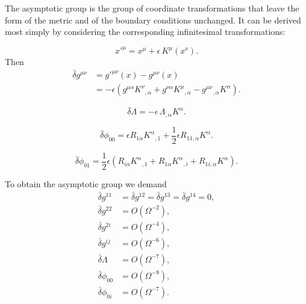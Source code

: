 The asymptotic group is the group of coordinate transformations
that leave the form of the metric and of the boundary conditions
unchanged. It can be derived most simply by considering the
corresponding infinitesimal transformations:

\begin{equation}
x'^{\mu}
=
x^{\mu}
+
\epsilon\,K^{\mu}(x^\nu).
\tag{8.1}
\end{equation}
Then
\begin{equation}
\begin{aligned}
\bar{\delta}g^{\mu\nu}
&=
g'^{\mu\nu}(x)-g^{\mu\nu}(x)
\\
&=
-\epsilon
\left(
g^{\mu\alpha}K^\nu{}_{,\alpha}
+
g^{\nu\alpha}K^\mu{}_{,\alpha}
-
g^{\mu\nu}{}_{,\alpha}K^\alpha
\right).
\end{aligned}
\tag{8.2}
\end{equation}

\begin{equation}
\bar{\delta}\Lambda
=
-\epsilon\,\Lambda_{,\alpha}K^\alpha.
\tag{8.3}
\end{equation}

\begin{equation}
\bar{\delta}\phi_{00}
=
\epsilon R_{1\alpha}K^\alpha{}_{,1}
+
\frac{1}{2}\epsilon R_{11,\alpha}K^\alpha.
\tag{8.4}
\end{equation}

\begin{equation}
\bar{\delta}\phi_{01}
=
\frac{1}{2}\epsilon
\left(
R_{i\alpha}K^\alpha{}_{,1}
+
R_{1\alpha}K^\alpha{}_{,i}
+
R_{1i,\alpha}K^\alpha
\right).
\tag{8.5}
\end{equation}

To obtain the asymptotic group we demand
\begin{equation}
\begin{aligned}
\bar{\delta}g^{11}
&=
\bar{\delta}g^{12}
=
\bar{\delta}g^{13}
=
\bar{\delta}g^{14}
=
0,
\\
\bar{\delta}g^{22}
&=
O(\Omega^{-2}),
\\
\bar{\delta}g^{2i}
&=
O(\Omega^{-4}),
\\
\bar{\delta}g^{ij}
&=
O(\Omega^{-6}),
\\
\bar{\delta}\Lambda
&=
O(\Omega^{-7}),
\\
\bar{\delta}\phi_{00}
&=
O(\Omega^{-9}),
\\
\bar{\delta}\phi_{0i}
&=
O(\Omega^{-7}).
\end{aligned}
\tag{8.6}
\end{equation}

